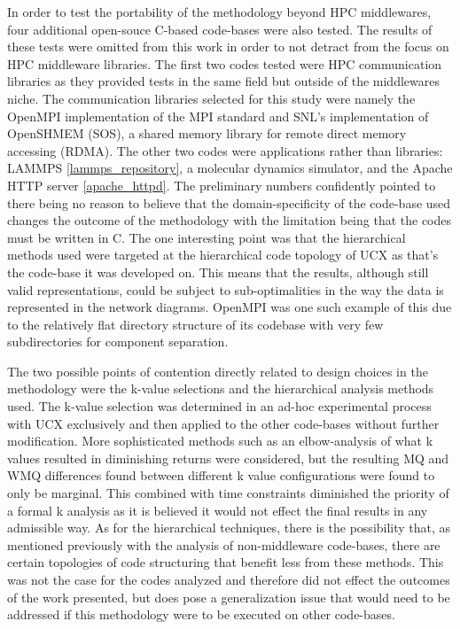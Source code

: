 In order to test the portability of the methodology beyond HPC middlewares, four additional open-souce C-based code-bases were also tested. The results of these tests were omitted from this work in order to not detract from the focus on HPC middleware libraries. The first two codes tested were HPC communication libraries as they provided tests in the same field but outside of the middlewares niche. The communication libraries selected for this study were namely the OpenMPI implementation of the MPI standard and SNL's implementation of OpenSHMEM (SOS), a shared memory library for remote direct memory accessing (RDMA). The other two codes were applications rather than libraries: LAMMPS \ref{lammps_repository}, a molecular dynamics simulator, and the Apache HTTP server \ref{apache_httpd}. The preliminary numbers confidently pointed to there being no reason to believe that the domain-specificity of the code-base used changes the outcome of the methodology with the limitation being that the codes must be written in C. The one interesting point was that the hierarchical methods used were targeted at the hierarchical code topology of UCX as that's the code-base it was developed on. This means that the results, although still valid representations, could be subject to sub-optimalities in the way the data is represented in the network diagrams. OpenMPI was one such example of this due to the relatively flat directory structure of its codebase with very few subdirectories for component separation.

The two possible points of contention directly related to design choices in the methodology were the k-value selections and the hierarchical analysis methods used. The k-value selection was determined in an ad-hoc experimental process with UCX exclusively and then applied to the other code-bases without further modification. More sophisticated methods such as an elbow-analysis of what k values resulted in diminishing returns were considered, but the resulting MQ and WMQ differences found between different k value configurations were found to only be marginal. This combined with time constraints diminished the priority of a formal k analysis as it is believed it would not effect the final results in any admissible way. As for the hierarchical techniques, there is the possibility that, as mentioned previously with the analysis of non-middleware code-bases, there are certain topologies of code structuring that benefit less from these methods. This was not the case for the codes analyzed and therefore did not effect the outcomes of the work presented, but does pose a generalization issue that would need to be addressed if this methodology were to be executed on other code-bases.

